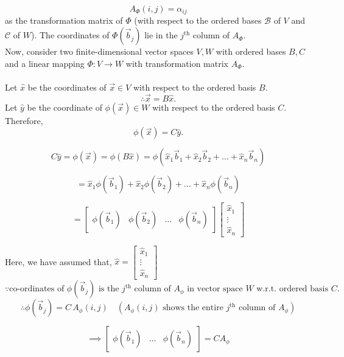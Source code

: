 \documentclass[12pt]{article}
\begin{document}
$$
A_\Phi(i,j) = \alpha_{ij}
$$
as the transformation matrix of $\Phi$ (with respect to the ordered bases $\mathcal{B}$ of $V$ and $\mathcal{C}$ of $W$).
\newpage
The coordinates of $\Phi(\vec{b}_j)$ lie in the $j^{\text{th}}$ column of $A_\Phi$. \\
Now, consider two finite-dimensional vector spaces $V, W$ with ordered bases $B, C$ and a linear mapping $\Phi : V \to W$ with transformation matrix $A_\Phi$. \\
\\
Let $\hat{x}$ be the coordinates of $\vec{x} \in V$ with respect to the ordered basis $B$.
$$\therefore
\vec{x} = B \hat{x}.
$$
Let $\hat{y}$ be the coordinate of $\phi(\vec{x}) \in W$ with respect to the ordered basis $C$. Therefore, 
$$
\phi(\vec{x}) = C \hat{y}.
$$

$$
C \hat{y} = \phi(\vec{x}) = \phi(B \hat{x}) = \phi\left(\hat{x}_1 \vec{b}_1 + \hat{x}_2 \vec{b}_2 + \dots + \hat{x}_n \vec{b}_n\right)
$$

$$
= \hat{x}_1 \phi(\vec{b}_1) + \hat{x}_2 \phi(\vec{b}_2) + \dots + \hat{x}_n \phi(\vec{b}_n)
$$

\begin{equation}
= \begin{bmatrix}
\phi(\vec{b}_1) & \phi(\vec{b}_2) & \dots & \phi(\vec{b}_n)
\end{bmatrix}
\begin{bmatrix}
\hat{x}_1 \\
\vdots \\
\hat{x}_n
\end{bmatrix}
\end{equation}


Here, we have assumed that, 
$
\hat{x} = 
\begin{bmatrix}
\hat{x}_1 \\
\vdots \\
\hat{x}_n
\end{bmatrix}
$
\\
$\because
\text{co-ordinates of } \phi(\vec{b}_j) \text{ is the } j^{\text{th}} \text{ column of } A_\phi \text{ in vector space } W \text{ w.r.t. ordered basis } C.
$\\
$$
\therefore \phi(\vec{b}_j) = C \, A_\phi(i,j)
\quad \left( A_\phi(i,j) \text{ shows the entire } j^{\text{th}} \text{ column of } A_\phi \right)
$$

$$
\implies 
\begin{bmatrix}
\phi(\vec{b}_1) & \dots & \phi(\vec{b}_n)
\end{bmatrix}
= C A_\phi
$$
\end{document}

